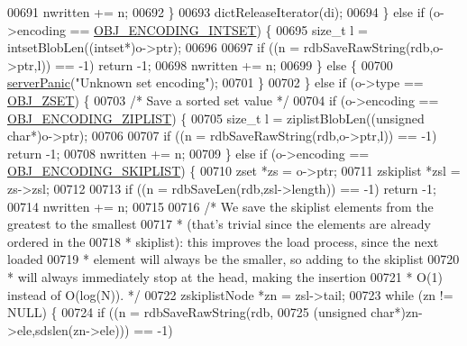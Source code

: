 \begin{DoxyCode}
{{{{{{{{00691                 nwritten += n;
00692             \}
00693             dictReleaseIterator(di);
00694         \} \textcolor{keywordflow}{else} \textcolor{keywordflow}{if} (o->encoding == \hyperlink{server_8h_a214173987de21c3b7661fddd42b05873}{OBJ\_ENCODING\_INTSET}) \{
00695             size\_t l = intsetBlobLen((intset*)o->ptr);
00696 
00697             \textcolor{keywordflow}{if} ((n = rdbSaveRawString(rdb,o->ptr,l)) == -1) \textcolor{keywordflow}{return} -1;
00698             nwritten += n;
00699         \} \textcolor{keywordflow}{else} \{
00700             \hyperlink{server_8h_a11cc378e7778a830b41240578de3b204}{serverPanic}(\textcolor{stringliteral}{"Unknown set encoding"});
00701         \}
00702     \} \textcolor{keywordflow}{else} \textcolor{keywordflow}{if} (o->type == \hyperlink{server_8h_a8c356422ddbc03bd77694880a30a1953}{OBJ\_ZSET}) \{
00703         \textcolor{comment}{/* Save a sorted set value */}
00704         \textcolor{keywordflow}{if} (o->encoding == \hyperlink{server_8h_aabf064ede983103f1fd0df2086e84eee}{OBJ\_ENCODING\_ZIPLIST}) \{
00705             size\_t l = ziplistBlobLen((\textcolor{keywordtype}{unsigned} \textcolor{keywordtype}{char}*)o->ptr);
00706 
00707             \textcolor{keywordflow}{if} ((n = rdbSaveRawString(rdb,o->ptr,l)) == -1) \textcolor{keywordflow}{return} -1;
00708             nwritten += n;
00709         \} \textcolor{keywordflow}{else} \textcolor{keywordflow}{if} (o->encoding == \hyperlink{server_8h_acfb35db5cb30ed113ed23aeb1a224c4c}{OBJ\_ENCODING\_SKIPLIST}) \{
00710             zset *zs = o->ptr;
00711             zskiplist *zsl = zs->zsl;
00712 
00713             \textcolor{keywordflow}{if} ((n = rdbSaveLen(rdb,zsl->length)) == -1) \textcolor{keywordflow}{return} -1;
00714             nwritten += n;
00715 
00716             \textcolor{comment}{/* We save the skiplist elements from the greatest to the smallest}
00717 \textcolor{comment}{             * (that's trivial since the elements are already ordered in the}
00718 \textcolor{comment}{             * skiplist): this improves the load process, since the next loaded}
00719 \textcolor{comment}{             * element will always be the smaller, so adding to the skiplist}
00720 \textcolor{comment}{             * will always immediately stop at the head, making the insertion}
00721 \textcolor{comment}{             * O(1) instead of O(log(N)). */}
00722             zskiplistNode *zn = zsl->tail;
00723             \textcolor{keywordflow}{while} (zn != NULL) \{
00724                 \textcolor{keywordflow}{if} ((n = rdbSaveRawString(rdb,
00725                     (\textcolor{keywordtype}{unsigned} \textcolor{keywordtype}{char}*)zn->ele,sdslen(zn->ele))) == -1)
}}}}}}}}
\end{DoxyCode}
